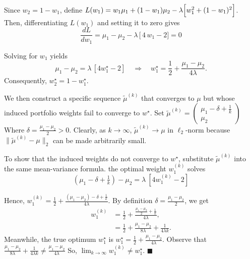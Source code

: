 Since $w_2 = 1 - w_1$, define $   L(w_1) =  w_1\mu_1 + (1 - w_1)\mu_2 -\lambda \Bigl[w_1^2 + (1 - w_1)^2 \Bigr]$. Then, differentiating $L(w_1)$ and setting it to zero gives 
\begin{equation}
      \frac{dL}{dw_1} = \mu_1 -\mu_2 - \lambda\,\bigl[\,4\,w_1 - 2\bigr] = 0
\end{equation}

Solving for $w_1$ yields
\begin{equation}
    \mu_1 -\mu_2 =  \lambda\,[4w_1^\star - 2] \quad\Longrightarrow\quad w_1^\star =  \frac{1}{2} + \frac{\mu_1 - \mu_2}{4 \lambda}.
\end{equation}
Consequently, $w_2^\star = 1- w^{\star}_1$.

We then construct a specific sequence $\tilde{{\mu}}^{(k)}$ that converges to ${\mu}$ but whose induced portfolio weights fail to converge to ${w}^\star$. Set $\tilde{{\mu}}^{(k)} = \begin{pmatrix}  \mu_1 - \delta + \tfrac{1}{k}\\  \mu_2 \end{pmatrix}$ Where $\delta = \frac{\mu_1 - \mu_2}{2} > 0$. Clearly, as $k \to \infty$, $\tilde{{\mu}}^{(k)} \to {\mu}$ in $\ell_2$-norm because $\|\tilde{{\mu}}^{(k)} - {\mu}\|_2$ can be made arbitrarily small.

To show that the induced weights do not converge to ${w^{\star}}$, substitute $\tilde{{\mu}}^{(k)}$ into the same mean-variance formula. the optimal weight $w_{1}^{(k)}$ solves 
\begin{equation}
     (\mu_1 - \delta + \tfrac{1}{k}) - \mu_2 =    \lambda\ [ 4w_1^{(k)}- 2]
\end{equation}

Hence, $   w_1^{(k)} = \frac{1}{2} + \frac{(\mu_1 - \mu_2) - \delta +  \tfrac{1}{k}}{4\lambda}$.  By definition $\delta = \tfrac{\mu_1 - \mu_2}{2}$, we get
\begin{equation}
\begin{aligned}
w_1^{(k)} &= \frac{1}{2} + \frac{\tfrac{\mu_1 - \mu_2}{2} + \tfrac{1}{k}}{4\lambda},\\
          &= \frac{1}{2} + \frac{\mu_1 - \mu_2}{8\lambda} + \frac{1}{4\lambda k}.
\end{aligned}
\end{equation}
Meanwhile, the true optimum $w_1^\star$ is $w_1^\star = \frac{1}{2} + \frac{\mu_1 - \mu_2}{4\lambda}$. Observe that $\frac{\mu_1 - \mu_2}{8\lambda} + \frac{1}{4\lambda k} \neq \frac{\mu_1 - \mu_2}{4\lambda}$ So, $\lim_{k\to\infty} w_1^{(k)} \neq w_1^\star$. $\blacksquare$
